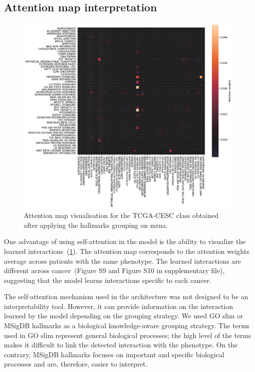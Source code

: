\documentclass[../main.tex]{subfiles}
\begin{document}
 \subsection{Attention map interpretation}

	 \begin{figure}[htbp]
		 \centering
		 \includegraphics[width=\linewidth]{Beaude.168.fig.4.pdf}
		 \caption{Attention map visualisation for the TCGA-CESC class obtained after applying the hallmarks grouping on \gls{mrna}.}\label{fig:att_map_viz}
	 \end{figure}

	 One advantage of using self-attention in the model is the ability to visualize the learned interactions~(\cref{fig:att_map_viz}).
	 The attention map corresponds to the attention weights average across patients with the same phenotype.
	 The learned interactions are different across cancer~(Figure S9 and Figure S10 in supplementary file), suggesting that the model learns interactions specific to each cancer.

	 The self-attention mechanism used in the architecture was not designed to be an interpretability tool.
	 However, it can provide information on the interaction learned by the model depending on the grouping strategy.
	 We used GO slim or MSigDB hallmarks as a biological knowledge-aware grouping strategy.
	 The terms used in GO slim represent general biological processes; the high level of the terms makes it difficult to link the detected interaction with the phenotype.
	 On the contrary, MSigDB hallmarks focuses on important and specific biological processes and  are, therefore, easier to interpret.
\end{document}
